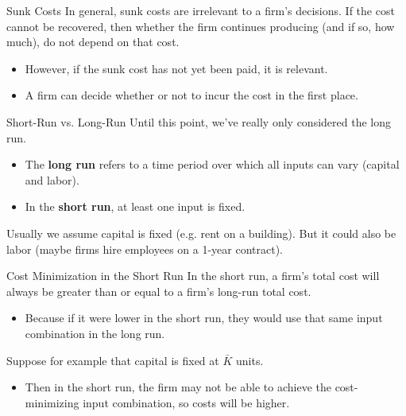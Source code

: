 \documentclass[11pt,t]{beamer}
\begin{document}
\begin{frame}{Sunk Costs}
  In general, sunk costs are irrelevant to a firm's decisions. If the cost cannot be recovered, then whether the firm continues producing (and if so, how much), do not depend on that cost.

  \begin{itemize}
    \item However, if the sunk cost has not yet been paid, it is relevant.
    
    \item A firm can decide whether or not to incur the cost in the first place.
  \end{itemize}
\end{frame}

\begin{frame}{Short-Run vs. Long-Run}
  Until this point, we've really only considered the long run.

  \begin{itemize}
    \item The \textbf{long run} refers to a time period over which all inputs can vary (capital and labor).
    \item In the \textbf{short run}, at least one input is fixed.
  \end{itemize}

  \bigskip
  Usually we assume capital is fixed (e.g. rent on a building). \pause But it could also be labor (maybe firms hire employees on a 1-year contract).
\end{frame}

\begin{frame}{Cost Minimization in the Short Run}
  In the short run, a firm's total cost will always be greater than or equal to a firm's long-run total cost.

  \begin{itemize}
    \item Because if it were lower in the short run, they would use that same input combination in the long run.
  \end{itemize}

  \pause\bigskip
  Suppose for example that capital is fixed at $\bar{K}$ units.

  \begin{itemize}
    \item Then in the short run, the firm may not be able to achieve the cost-minimizing input combination, so costs will be higher.
  \end{itemize}
\end{frame}
\end{document}
